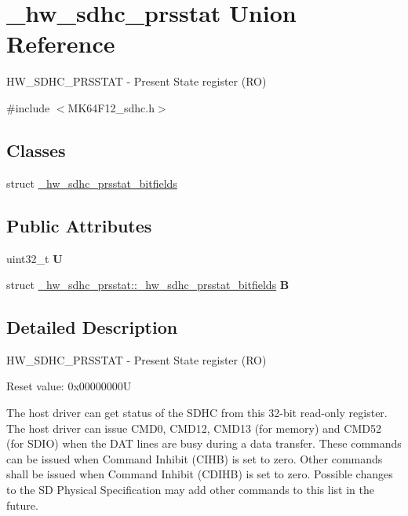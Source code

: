 \hypertarget{union__hw__sdhc__prsstat}{}\section{\+\_\+hw\+\_\+sdhc\+\_\+prsstat Union Reference}
\label{union__hw__sdhc__prsstat}


H\+W\+\_\+\+S\+D\+H\+C\+\_\+\+P\+R\+S\+S\+T\+AT -\/ Present State register (RO)  




{\ttfamily \#include $<$M\+K64\+F12\+\_\+sdhc.\+h$>$}

\subsection*{Classes}
\begin{DoxyCompactItemize}
\item 
struct \hyperlink{struct__hw__sdhc__prsstat_1_1__hw__sdhc__prsstat__bitfields}{\+\_\+hw\+\_\+sdhc\+\_\+prsstat\+\_\+bitfields}
\end{DoxyCompactItemize}
\subsection*{Public Attributes}
\begin{DoxyCompactItemize}
\item 
uint32\+\_\+t {\bfseries U}\hypertarget{union__hw__sdhc__prsstat_ad9681b55f436cef0bbb8aa62358a9eab}{}\label{union__hw__sdhc__prsstat_ad9681b55f436cef0bbb8aa62358a9eab}

\item 
struct \hyperlink{struct__hw__sdhc__prsstat_1_1__hw__sdhc__prsstat__bitfields}{\+\_\+hw\+\_\+sdhc\+\_\+prsstat\+::\+\_\+hw\+\_\+sdhc\+\_\+prsstat\+\_\+bitfields} {\bfseries B}\hypertarget{union__hw__sdhc__prsstat_a04b72eedd40bcaa62996f2cadb04af61}{}\label{union__hw__sdhc__prsstat_a04b72eedd40bcaa62996f2cadb04af61}

\end{DoxyCompactItemize}


\subsection{Detailed Description}
H\+W\+\_\+\+S\+D\+H\+C\+\_\+\+P\+R\+S\+S\+T\+AT -\/ Present State register (RO) 

Reset value\+: 0x00000000U

The host driver can get status of the S\+D\+HC from this 32-\/bit read-\/only register. The host driver can issue C\+M\+D0, C\+M\+D12, C\+M\+D13 (for memory) and C\+M\+D52 (for S\+D\+IO) when the D\+AT lines are busy during a data transfer. These commands can be issued when Command Inhibit (C\+I\+HB) is set to zero. Other commands shall be issued when Command Inhibit (C\+D\+I\+HB) is set to zero. Possible changes to the SD Physical Specification may add other commands to this list in the future. 

